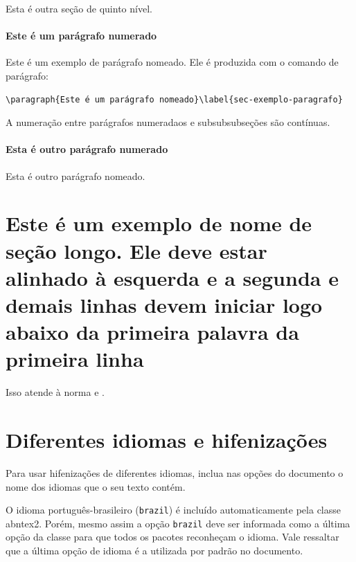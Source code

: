 \label{sec-exemplo-subsubsubsection-outro}

Esta é outra seção de quinto nível.

\paragraph{Este é um parágrafo numerado}\label{sec-exemplo-paragrafo}

Este é um exemplo de parágrafo nomeado. Ele é produzida com o comando de parágrafo:

\begin{verbatim}
\paragraph{Este é um parágrafo nomeado}\label{sec-exemplo-paragrafo}
\end{verbatim}

A numeração entre parágrafos numeradaos e subsubsubseções são contínuas.

\paragraph{Esta é outro parágrafo numerado}\label{sec-exemplo-paragrafo-outro}

Esta é outro parágrafo nomeado.

\section{Este é um exemplo de nome de seção longo. Ele deve estar alinhado à esquerda e a segunda e demais linhas devem iniciar logo abaixo da primeira palavra da primeira linha}

Isso atende à norma \textcite[seções 5.2.2 a 5.2.4]{NBR14724:2011} e \textcite[seções 3.1 a 3.8]{NBR6024:2012}.

\section{Diferentes idiomas e hifenizações}
\label{sec-hifenizacao}

Para usar hifenizações de diferentes idiomas, inclua nas opções do documento o nome dos idiomas que o seu texto contém.

O idioma português-brasileiro (\texttt{brazil}) é incluído automaticamente pela classe \textsf{abntex2}. Porém, mesmo assim a opção \texttt{brazil} deve ser informada como a última opção da classe para que todos os pacotes reconheçam o idioma. Vale ressaltar que a última opção de idioma é a utilizada por padrão no documento.

